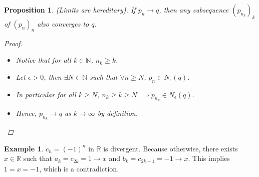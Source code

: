 \documentclass[10pt]{article}
\newcommand{\N}{\mathbb{N}}
\newcommand{\R}{\mathbb{R}}
\newtheorem{proposition}[theorem]{Proposition}
\theoremstyle{definition}
\newtheorem{example}[theorem]{Example}
\theoremstyle{remark}
\begin{document}
\begin{proposition}
    (Limits are hereditary).
    If $p_n \to q$, then any subsequence $(p_{n_k})_k$ of $(p_n)_n$ also converges to $q$.
    \begin{proof}
        \hfill
        \begin{itemize}
            \item Notice that for all $k \in \N$, $n_k \geq k$.
            \item Let $\epsilon > 0$, then $\exists N \in \N$ such that $\forall n \geq N$, $p_n \in N_\epsilon(q)$.
            \item In particular for all $k \geq N$, $n_k \geq k \geq N \implies p_{n_k} \in N_\epsilon(q)$.
            \item Hence, $p_{n_k} \to q$ as $k \to \infty$ by definition.
        \end{itemize}
    \end{proof}
\end{proposition}

\begin{example}
    $c_n = (-1)^n$ in $\R$ is divergent. Because otherwise, there exists $x \in \R$ such that
    $a_k = c_{2k} = 1 \to x$ and $b_k = c_{2k+1} = -1 \to x$.
    This implies $1 = x = -1$, which is a contradiction.
\end{example}
\end{document}
